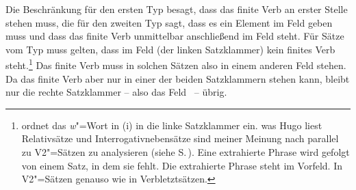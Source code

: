 \ex\label{v2-clause-type}  \impl {}
\ex\label{subord-clause-types}  \impl {}
\zl
Die Beschränkung für den ersten Typ besagt, dass das finite Verb an erster Stelle stehen muss,
die für den zweiten Typ sagt, dass es ein Element im Feld  geben muss und dass das
finite Verb unmittelbar anschließend im Feld  steht. Für Sätze vom Typ
 muss gelten, dass im Feld  (der linken Satzklammer) kein finites
Verb steht.\footnote{%
  \citet[]{Kathol2001a} ordnet das \emph{w}"=Wort in (i) in die linke Satzklammer ein.
\ea
was Hugo liest
\z
Relativsätze und Interrogativnebensätze sind meiner Meinung nach parallel zu V2"=Sätzen zu
analysieren (siehe S.\,\pageref{Seite-Relativsätze-Interrogativnebensätze}). Eine extrahierte Phrase
wird gefolgt von einem Satz, in dem sie fehlt. Die extrahierte Phrase steht im Vorfeld. In
V2"=Sätzen genauso wie in Verbletztsätzen.
} Das finite Verb muss in solchen Sätzen also in einem anderen Feld stehen. Da das
finite Verb aber nur in einer der beiden Satzklammern stehen kann, bleibt nur die rechte Satzklammer
-- also das Feld~ -- übrig.

